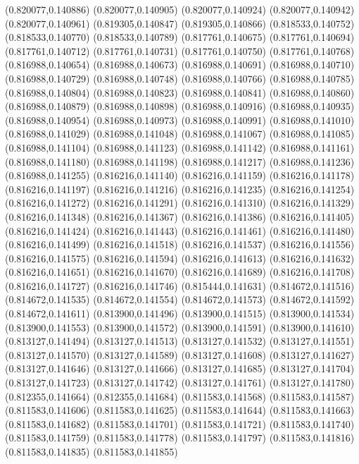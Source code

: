 (0.820077,0.140886)
(0.820077,0.140905)
(0.820077,0.140924)
(0.820077,0.140942)
(0.820077,0.140961)
(0.819305,0.140847)
(0.819305,0.140866)
(0.818533,0.140752)
(0.818533,0.140770)
(0.818533,0.140789)
(0.817761,0.140675)
(0.817761,0.140694)
(0.817761,0.140712)
(0.817761,0.140731)
(0.817761,0.140750)
(0.817761,0.140768)
(0.816988,0.140654)
(0.816988,0.140673)
(0.816988,0.140691)
(0.816988,0.140710)
(0.816988,0.140729)
(0.816988,0.140748)
(0.816988,0.140766)
(0.816988,0.140785)
(0.816988,0.140804)
(0.816988,0.140823)
(0.816988,0.140841)
(0.816988,0.140860)
(0.816988,0.140879)
(0.816988,0.140898)
(0.816988,0.140916)
(0.816988,0.140935)
(0.816988,0.140954)
(0.816988,0.140973)
(0.816988,0.140991)
(0.816988,0.141010)
(0.816988,0.141029)
(0.816988,0.141048)
(0.816988,0.141067)
(0.816988,0.141085)
(0.816988,0.141104)
(0.816988,0.141123)
(0.816988,0.141142)
(0.816988,0.141161)
(0.816988,0.141180)
(0.816988,0.141198)
(0.816988,0.141217)
(0.816988,0.141236)
(0.816988,0.141255)
(0.816216,0.141140)
(0.816216,0.141159)
(0.816216,0.141178)
(0.816216,0.141197)
(0.816216,0.141216)
(0.816216,0.141235)
(0.816216,0.141254)
(0.816216,0.141272)
(0.816216,0.141291)
(0.816216,0.141310)
(0.816216,0.141329)
(0.816216,0.141348)
(0.816216,0.141367)
(0.816216,0.141386)
(0.816216,0.141405)
(0.816216,0.141424)
(0.816216,0.141443)
(0.816216,0.141461)
(0.816216,0.141480)
(0.816216,0.141499)
(0.816216,0.141518)
(0.816216,0.141537)
(0.816216,0.141556)
(0.816216,0.141575)
(0.816216,0.141594)
(0.816216,0.141613)
(0.816216,0.141632)
(0.816216,0.141651)
(0.816216,0.141670)
(0.816216,0.141689)
(0.816216,0.141708)
(0.816216,0.141727)
(0.816216,0.141746)
(0.815444,0.141631)
(0.814672,0.141516)
(0.814672,0.141535)
(0.814672,0.141554)
(0.814672,0.141573)
(0.814672,0.141592)
(0.814672,0.141611)
(0.813900,0.141496)
(0.813900,0.141515)
(0.813900,0.141534)
(0.813900,0.141553)
(0.813900,0.141572)
(0.813900,0.141591)
(0.813900,0.141610)
(0.813127,0.141494)
(0.813127,0.141513)
(0.813127,0.141532)
(0.813127,0.141551)
(0.813127,0.141570)
(0.813127,0.141589)
(0.813127,0.141608)
(0.813127,0.141627)
(0.813127,0.141646)
(0.813127,0.141666)
(0.813127,0.141685)
(0.813127,0.141704)
(0.813127,0.141723)
(0.813127,0.141742)
(0.813127,0.141761)
(0.813127,0.141780)
(0.812355,0.141664)
(0.812355,0.141684)
(0.811583,0.141568)
(0.811583,0.141587)
(0.811583,0.141606)
(0.811583,0.141625)
(0.811583,0.141644)
(0.811583,0.141663)
(0.811583,0.141682)
(0.811583,0.141701)
(0.811583,0.141721)
(0.811583,0.141740)
(0.811583,0.141759)
(0.811583,0.141778)
(0.811583,0.141797)
(0.811583,0.141816)
(0.811583,0.141835)
(0.811583,0.141855)

